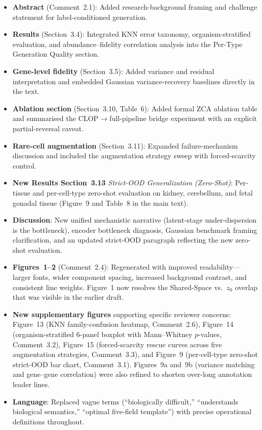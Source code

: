 \documentclass[11pt,letterpaper]{article}
\begin{document}
\begin{itemize}
  \item \textbf{Abstract} (Comment~2.1): Added research-background framing and challenge
    statement for label-conditioned generation.
  \item \textbf{Results} (Section~3.4): Integrated KNN error taxonomy, organism-stratified
    evaluation, and abundance--fidelity correlation analysis into the Per-Type Generation
    Quality section.
  \item \textbf{Gene-level fidelity} (Section~3.5): Added variance and residual
    interpretation and embedded Gaussian variance-recovery baselines directly in the text.
  \item \textbf{Ablation section} (Section~3.10, Table~6): Added formal
    ZCA ablation table and summarised the CLOP$\to$full-pipeline bridge experiment with
    an explicit partial-reversal caveat.
  \item \textbf{Rare-cell augmentation} (Section~3.11): Expanded failure-mechanism
    discussion and included the augmentation strategy sweep with forced-scarcity control.
  \item \textbf{New Results Section~3.13} \emph{Strict-OOD Generalization (Zero-Shot)}:
    Per-tissue and per-cell-type zero-shot evaluation on kidney, cerebellum, and fetal
    gonadal tissue (Figure~9 and Table~8 in the main text).
  \item \textbf{Discussion}: New unified mechanistic narrative (latent-stage under-dispersion
    is the bottleneck), encoder bottleneck diagnosis, Gaussian benchmark framing
    clarification, and an updated strict-OOD paragraph reflecting the new zero-shot
    evaluation.
  \item \textbf{Figures~1--2} (Comment~2.4): Regenerated with improved readability---larger
    fonts, wider component spacing, increased background contrast, and consistent line weights.
    Figure~1 now resolves the Shared-Space vs.\ $z_0$ overlap that was visible in the earlier
    draft.
  \item \textbf{New supplementary figures} supporting specific reviewer concerns: Figure~13
    (KNN family-confusion heatmap, Comment~2.6), Figure~14 (organism-stratified 6-panel
    boxplot with Mann--Whitney $p$-values, Comment~3.2), Figure~15 (forced-scarcity rescue
    curves across five augmentation strategies, Comment~3.3), and Figure~9 (per-cell-type
    zero-shot strict-OOD bar chart, Comment~3.1). Figures~9a and~9b (variance matching and
    gene--gene correlation) were also refined to shorten over-long annotation leader lines.
  \item \textbf{Language}: Replaced vague terms (``biologically difficult,''
    ``understands biological semantics,'' ``optimal five-field template'') with precise
    operational definitions throughout.
\end{itemize}
\end{document}
